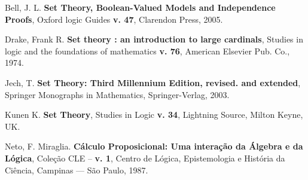 \documentclass[12pt]{article}
\begin{document}
        \begin{thebibliography}{MMMM}
    
             Bell, J. L. {\bf Set Theory, Boolean-Valued Models and Independence Proofs},
                Oxford logic Guides {\bf v. 47}, Clarendon Press, 2005.
    
             Drake, Frank R. {\bf Set theory : an introduction to large cardinals}, 
            Studies in logic and the foundations of mathematics {\bf v. 76}, American Elsevier Pub. Co., 1974.
    
             Jech, T. {\bf Set Theory: Third Millennium Edition, revised. and extended}, 
                Springer Monographs in Mathematics, Springer-Verlag, 2003.
    
             Kunen K. {\bf Set Theory}, Studies in Logic {\bf v. 34}, 
                Lightning Source, Milton Keyne, UK.
    
    
             Neto, F. Miraglia. {\bf Cálculo Proposicional: Uma interação da Álgebra e da Lógica},
                Coleção CLE -- {\bf v. 1}, Centro de Lógica, Epistemologia e História da Ciência, Campinas --- São Paulo, 1987. 
        
        \end{thebibliography}
    
\end{document}
